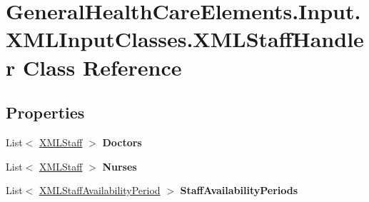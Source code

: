 \hypertarget{class_general_health_care_elements_1_1_input_1_1_x_m_l_input_classes_1_1_x_m_l_staff_handler}{}\section{General\+Health\+Care\+Elements.\+Input.\+X\+M\+L\+Input\+Classes.\+X\+M\+L\+Staff\+Handler Class Reference}
\label{class_general_health_care_elements_1_1_input_1_1_x_m_l_input_classes_1_1_x_m_l_staff_handler}
\subsection*{Properties}
\begin{DoxyCompactItemize}
\item 
List$<$ \hyperlink{class_general_health_care_elements_1_1_input_1_1_x_m_l_input_classes_1_1_x_m_l_staff}{X\+M\+L\+Staff} $>$ {\bfseries Doctors}\hypertarget{class_general_health_care_elements_1_1_input_1_1_x_m_l_input_classes_1_1_x_m_l_staff_handler_a3cfc867f2e98382f929835176e85b6a5}{}\label{class_general_health_care_elements_1_1_input_1_1_x_m_l_input_classes_1_1_x_m_l_staff_handler_a3cfc867f2e98382f929835176e85b6a5}

\item 
List$<$ \hyperlink{class_general_health_care_elements_1_1_input_1_1_x_m_l_input_classes_1_1_x_m_l_staff}{X\+M\+L\+Staff} $>$ {\bfseries Nurses}\hypertarget{class_general_health_care_elements_1_1_input_1_1_x_m_l_input_classes_1_1_x_m_l_staff_handler_a03d8cf9923c480e1e144f30e1a9160c2}{}\label{class_general_health_care_elements_1_1_input_1_1_x_m_l_input_classes_1_1_x_m_l_staff_handler_a03d8cf9923c480e1e144f30e1a9160c2}

\item 
List$<$ \hyperlink{class_general_health_care_elements_1_1_input_1_1_x_m_l_input_classes_1_1_x_m_l_staff_availability_period}{X\+M\+L\+Staff\+Availability\+Period} $>$ {\bfseries Staff\+Availability\+Periods}\hypertarget{class_general_health_care_elements_1_1_input_1_1_x_m_l_input_classes_1_1_x_m_l_staff_handler_aab1101a9719772955ec436b759951d3d}{}\label{class_general_health_care_elements_1_1_input_1_1_x_m_l_input_classes_1_1_x_m_l_staff_handler_aab1101a9719772955ec436b759951d3d}


\end{DoxyCompactItemize}

